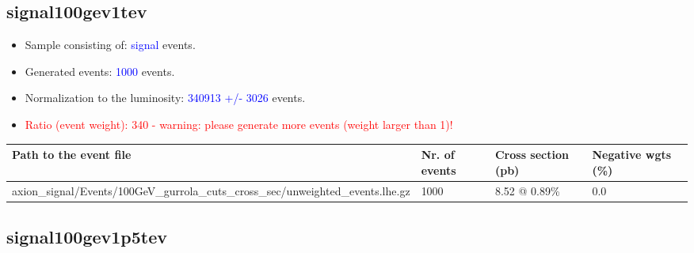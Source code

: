 \documentclass[a4paper, 10pt]{article}
\begin{document}
\subsection{ signal100gev1tev}

\begin{itemize}
  \item Sample consisting of: \textcolor{blue}{signal}  events.
   \item Generated events: \textcolor{blue}{1000 }  events.
   \item Normalization to the luminosity: \textcolor{blue}{340913}\textcolor{blue}{ +/\-- }\textcolor{blue}{3026 }  events.
   \item\textcolor{red}{Ratio (event weight): }\textcolor{red}{340 }\textcolor{red}{ - warning: please generate more events (weight larger than 1)!}
\textcolor{red}{}
\end{itemize}
\begin{table}[H]
  \begin{center}
    \begin{tabular}{|m{55.0mm}|m{25.0mm}|m{30.0mm}|m{30.0mm}|}
      \hline
      {\cellcolor{yellow}         Path to the event file}& {\cellcolor{yellow}         Nr. of events}& {\cellcolor{yellow}         Cross section (pb)}& {\cellcolor{yellow}         Negative wgts (\%)}\\
      \hline
      {\cellcolor{white}          axion\_signal/\-Events/\-100GeV\_gurrola\_cuts\_cross\_sec/\-unweighted\_events.lhe.gz}& {\cellcolor{white}          1000}& {\cellcolor{white}          8.52 @ 0.89\%}& {\cellcolor{white}          0.0}\\
\hline
    \end{tabular}
  \end{center}
\end{table}

\subsection{ signal100gev1p5tev}
\end{document}
